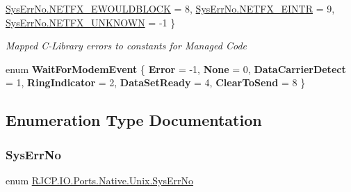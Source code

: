 \begin{DoxyCompactItemize}
\newline
\mbox{\hyperlink{namespace_r_j_c_p_1_1_i_o_1_1_ports_1_1_native_1_1_unix_a2572bff8d7f2e644fdffa38ae8565872a26e39b9f7d1baa3962d835b7c03400b7}{Sys\+Err\+No.\+N\+E\+T\+F\+X\+\_\+\+E\+W\+O\+U\+L\+D\+B\+L\+O\+CK}} = 8, 
\mbox{\hyperlink{namespace_r_j_c_p_1_1_i_o_1_1_ports_1_1_native_1_1_unix_a2572bff8d7f2e644fdffa38ae8565872a093e87bc223eb4f831f9952fc32b9da0}{Sys\+Err\+No.\+N\+E\+T\+F\+X\+\_\+\+E\+I\+N\+TR}} = 9, 
\mbox{\hyperlink{namespace_r_j_c_p_1_1_i_o_1_1_ports_1_1_native_1_1_unix_a2572bff8d7f2e644fdffa38ae8565872aa415d52dc2a951b0bbe2c5e71ea1e61b}{Sys\+Err\+No.\+N\+E\+T\+F\+X\+\_\+\+U\+N\+K\+N\+O\+WN}} = -\/1
 \}
\begin{DoxyCompactList}\small\item\em Mapped C-\/\+Library errors to constants for Managed Code \end{DoxyCompactList}\item 
\mbox{\label{namespace_r_j_c_p_1_1_i_o_1_1_ports_1_1_native_1_1_unix_aecb7aa4738bc033b7b22332084b0eb13}} 
enum {\bfseries Wait\+For\+Modem\+Event} \{ \newline
{\bfseries Error} = -\/1, 
{\bfseries None} = 0, 
{\bfseries Data\+Carrier\+Detect} = 1, 
{\bfseries Ring\+Indicator} = 2, 
\newline
{\bfseries Data\+Set\+Ready} = 4, 
{\bfseries Clear\+To\+Send} = 8
 \}
\end{DoxyCompactItemize}


\subsection{Enumeration Type Documentation}
\mbox{\label{namespace_r_j_c_p_1_1_i_o_1_1_ports_1_1_native_1_1_unix_a2572bff8d7f2e644fdffa38ae8565872}} 
\subsubsection{\texorpdfstring{SysErrNo}{SysErrNo}}
{\footnotesize\ttfamily enum \mbox{\hyperlink{namespace_r_j_c_p_1_1_i_o_1_1_ports_1_1_native_1_1_unix_a2572bff8d7f2e644fdffa38ae8565872}{R\+J\+C\+P.\+I\+O.\+Ports.\+Native.\+Unix.\+Sys\+Err\+No}}\hspace{0.3cm}{\ttfamily [strong]}}



